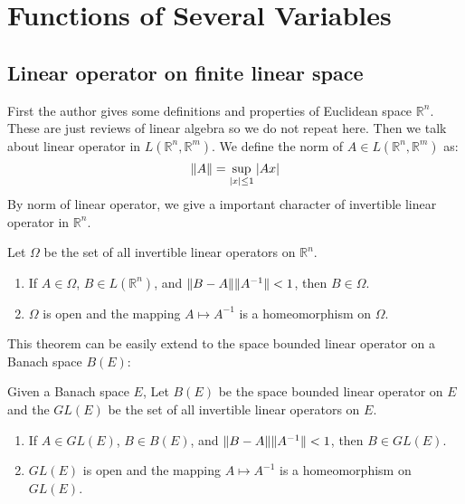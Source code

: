 % 
\chapter{Functions of Several Variables}
\section{Linear operator on finite linear space}
First the author gives some definitions and properties of Euclidean space $\mathbb{R}^n$. These are just reviews of linear algebra so we do not repeat here. Then we talk about linear operator in $L(\mathbb{R}^n,\mathbb{R}^m)$. We define the norm of $A\in L(\mathbb{R}^n,\mathbb{R}^m)$ as:
\begin{equation*}
    \lVert A\rVert=\sup_{\left\lvert x\right\rvert\leq 1}\left\lvert Ax\right\rvert
\end{equation*}
By norm of linear operator, we give a important character of invertible linear operator in $\mathbb{R}^n$.
\begin{theorem}
    Let $\Omega$ be the set of all invertible linear operators on $\mathbb{R}^n$.
    \begin{enumerate}
        \item If $A\in\Omega$, $B\in L(\mathbb{R}^n)$, and $\lVert B-A\rVert\lVert A^{-1}\rVert<1$, then $B\in\Omega$.
        \item $\Omega$ is open and the mapping $A\mapsto A^{-1}$ is a homeomorphism on $\Omega$.
    \end{enumerate}
\end{theorem}
This theorem can be easily extend to the space bounded linear operator on a Banach space $B(E)$:
\begin{theorem}
    Given a Banach space $E$, Let $B(E)$ be the space bounded linear operator on $E$ and the $GL(E)$ be the set of all invertible linear operators on $E$.
    \begin{enumerate}
        \item If $A\in GL(E)$, $B\in B(E)$, and $\lVert B-A\rVert\lVert A^{-1}\rVert<1$, then $B\in GL(E)$.
        \item $GL(E)$ is open and the mapping $A\mapsto A^{-1}$ is a homeomorphism on $GL(E)$.
    \end{enumerate}
\end{theorem}
